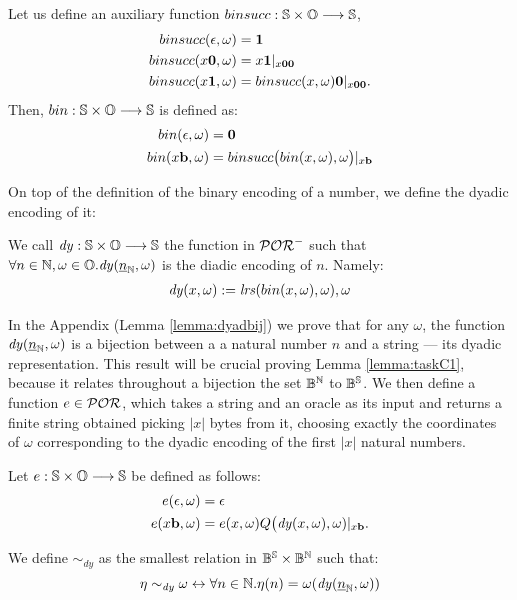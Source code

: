 \begin{defn}
Let us define an auxiliary function
$binsucc:\mathbb{S}\times \mathbb{O}\longrightarrow \mathbb{S}$,
\begin{align*}
binsucc(\epsilon,\omega) &= {\mathbf{1}} \\
binsucc(x\mathbf{0},\omega) &= x\mathbf{1}|_{x\mathbf{0}\mathbf{0}} \\
binsucc(x\mathbf{1},\omega) &= binsucc(x,
\omega)\mathbf{0}|_{x\mathbf{0}\mathbf{0}}.
\end{align*}
Then, $bin:\mathbb{S}\times \mathbb{O} \longrightarrow \mathbb{S}$ is
defined as:
\begin{align*}
bin(\epsilon,\omega) &= {\mathbf{0}} \\
bin(x\mathbf{b},\omega) &= binsucc\big(bin(x,\omega),\omega\big)|_{x\mathbf{b}}
\end{align*}
\end{defn}
%
On top of the definition of the binary encoding of a number,
we define the dyadic encoding of it:
\begin{defn}
  We call $\mathit{dy}: \mathbb{S} \times \mathbb{O} \longrightarrow \mathbb{S}$ the function in $\mathcal{POR}^-$ such that
  $\forall n \in \mathbb{N}, \omega \in \mathbb{O}. \mathit{dy}({\underline {n}}_{\mathbb{N}}, \omega)$ is the diadic encoding of $n$.
  Namely:
  \begin{align*}
    \mathit{dy}(x, \omega):= \mathit{lrs}(bin(x, \omega), \omega), \omega
  \end{align*}
\end{defn}
%
In the Appendix (Lemma \ref{lemma:dyadbij})
we prove that for any $\omega$,
the function $\mathit{dy}({\underline {n}}_{\mathbb{N}}, \omega)$
is a bijection between a a natural number $n$ and a string
--- its dyadic representation.
This result will be crucial proving Lemma \ref{lemma:taskC1}, because it relates
throughout a bijection the set $\mathbb{B}^{\mathbb{N}}$ to $\mathbb{B}^{\mathbb{S}}$.
%
%
%
%
%
%
%
\noindent
We then define a function $e \in \mathcal{POR}$,
which takes a string and an oracle
as its input and returns a finite string obtained picking $|x|$ bytes from it,
choosing exactly the coordinates of $\omega$ corresponding to the dyadic encoding
of the first $|x|$ natural numbers.
\begin{defn}
Let $e :\mathbb{S}\times \mathbb{O} \longrightarrow \mathbb{S}$ be defined as follows:
\begin{align*}
e(\eepsilon,\omega) &= \eepsilon \\
%
e(x\bool,\omega) &= e(x, \omega)Q\big(\mathit{dy}(x,\omega),\omega)|_{x\bool}.
\end{align*}
\end{defn}
%
%
\noindent

\begin{defn}
  We define $\sim_{\mathit{dy}}$ as the smallest relation in
   $\mathbb{B}^{\mathbb{S}}\times \mathbb{B}^{\mathbb{N}}$ such that:
   $$
   \eta \sim_\mathit{dy} \omega \leftrightarrow \forall n \in \mathbb{N}.
    \eta(n)= \omega (\mathit{dy}({\underline {n}}_{\mathbb{N}}, \omega))
   $$
\end{defn}

